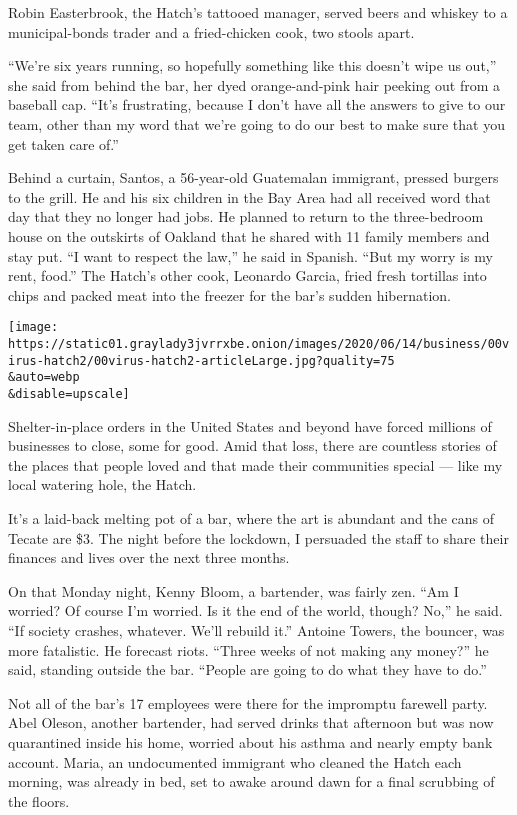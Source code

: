 Robin Easterbrook, the Hatch's tattooed manager, served beers and
whiskey to a municipal-bonds trader and a fried-chicken cook, two stools
apart.

``We're six years running, so hopefully something like this doesn't wipe
us out,'' she said from behind the bar, her dyed orange-and-pink hair
peeking out from a baseball cap. ``It's frustrating, because I don't
have all the answers to give to our team, other than my word that we're
going to do our best to make sure that you get taken care of.''

Behind a curtain, Santos, a 56-year-old Guatemalan immigrant, pressed
burgers to the grill. He and his six children in the Bay Area had all
received word that day that they no longer had jobs. He planned to
return to the three-bedroom house on the outskirts of Oakland that he
shared with 11 family members and stay put. ``I want to respect the
law,'' he said in Spanish. ``But my worry is my rent, food.'' The
Hatch's other cook, Leonardo Garcia, fried fresh tortillas into chips
and packed meat into the freezer for the bar's sudden hibernation.

\texttt{[image: https://static01.graylady3jvrrxbe.onion/images/2020/06/14/business/00virus-hatch2/00virus-hatch2-articleLarge.jpg?quality=75\\\&auto=webp\\\&disable=upscale]}

Shelter-in-place orders in the United States and beyond have forced
millions of businesses to close, some for good. Amid that loss, there
are countless stories of the places that people loved and that made
their communities special --- like my local watering hole, the Hatch.

It's a laid-back melting pot of a bar, where the art is abundant and the
cans of Tecate are \$3. The night before the lockdown, I persuaded the
staff to share their finances and lives over the next three months.

On that Monday night, Kenny Bloom, a bartender, was fairly zen. ``Am I
worried? Of course I'm worried. Is it the end of the world, though?
No,'' he said. ``If society crashes, whatever. We'll rebuild it.''
Antoine Towers, the bouncer, was more fatalistic. He forecast riots.
``Three weeks of not making any money?'' he said, standing outside the
bar. ``People are going to do what they have to do.''

Not all of the bar's 17 employees were there for the impromptu farewell
party. Abel Oleson, another bartender, had served drinks that afternoon
but was now quarantined inside his home, worried about his asthma and
nearly empty bank account. Maria, an undocumented immigrant who cleaned
the Hatch each morning, was already in bed, set to awake around dawn for
a final scrubbing of the floors.


